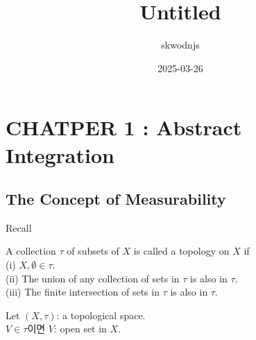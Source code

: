 \documentclass[11pt]{article}
\renewcommand{\(}{\left(}
\renewcommand{\)}{\right)}
\renewcommand{\[}{\left[}
\renewcommand{\]}{\right]}
\newcommand{\tags}[1]{#1}
\newenvironment{text-box}{}{}
\newcommand{\subheading}[1]{#1}
\begin{document}
\title{Untitled}
\date{2025-03-26}
\tags{}
\author{skwodnjs}

\maketitle

\section{CHATPER 1 : Abstract Integration}

\subsection{The Concept of Measurability}

\subheading{Recall}

\begin{text-box}
    A collection $\tau$ of subsets of $X$ is called a topology on $X$ if \\
    (i) $X, \emptyset \in \tau$. \\
    (ii) The union of any collection of sets in $\tau$ is also in $\tau$. \\
    (iii) The finite intersection of sets in $\tau$ is also in $\tau$.
\end{text-box}

\begin{text-box}
    Let $(X, \tau)$: a topological space. \\
    $V \in \tau$이면 $V$: open set in $X$.    
\end{text-box}
\end{document}
